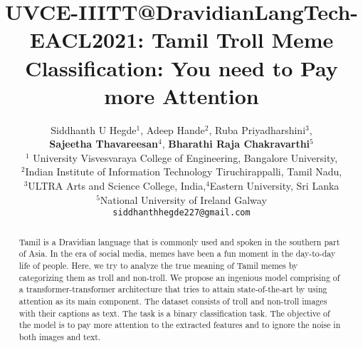 \documentclass[11pt,a4paper]{article}
\title{UVCE-IIITT@DravidianLangTech-EACL2021: Tamil Troll Meme Classification: You need to Pay more Attention}
\author{Siddhanth U Hegde\(^1\), Adeep Hande\(^2\), Ruba Priyadharshini\(^3\), \\\textbf{Sajeetha Thavareesan\(^4\)}, \textbf{Bharathi Raja Chakravarthi\(^5\)} \\  \(^1\) University Visvesvaraya College of Engineering, Bangalore University, \\  \(^2\)Indian Institute of Information Technology Tiruchirappalli, Tamil Nadu, \\ \(^3\)ULTRA Arts and Science College, India,\(^4\)Eastern University, Sri Lanka\\  \(^5\)National University of Ireland Galway \\   {\tt siddhanthhegde227@gmail.com}}
\date{}
\begin{document}
\maketitle
\begin{abstract}
 Tamil is a Dravidian language that is commonly used and spoken in the southern part of Asia. In the era of social media, memes have been a fun moment in the day-to-day life of people. Here, we try to analyze the true meaning of Tamil memes by categorizing them as troll and non-troll. We propose an ingenious model comprising of a transformer-transformer architecture that tries to attain state-of-the-art by using attention as its main component. The dataset consists of troll and non-troll images with their captions as text. The task is a binary classification task. The objective of the model is to pay more attention to the extracted features and to ignore the noise in both images and text.
\end{abstract}
 
\end{document}
